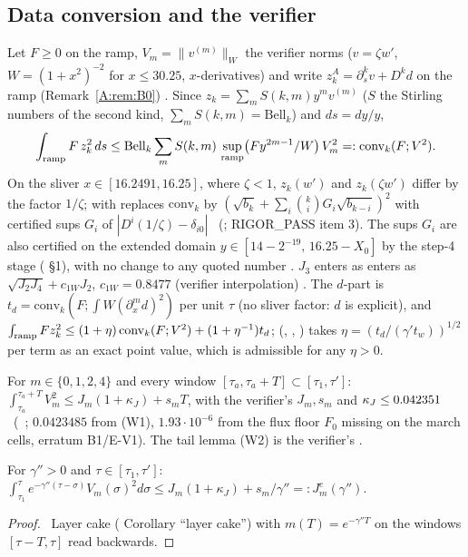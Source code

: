 \documentclass[11pt]{article}
\begin{document}
\subsection{Data conversion and the verifier}
\begin{lemma}\label{A:lem:conv}
Let $F\ge0$ on the ramp, $V_m=\|v^{(m)}\|_W$ the verifier norms ($v=\zeta w'$, $W=(1+x^2)^{-2}$ for $x\le30.25$, $x$-derivatives) and write $z^A_k=\partial_s^kv+D^kd$ on the ramp (Remark~\ref{A:rem:B0}) \tB. Since $z_k=\sum_mS(k,m)y^mv^{(m)}$ ($S$ the Stirling numbers of the second kind, $\sum_mS(k,m)=\mathrm{Bell}_k$) and $ds=dy/y$,
\[
\int_{\rm ramp}F\,z_k^2\,ds\le\mathrm{Bell}_k\sum_mS(k,m)\,\sup_{\rm ramp}\bigl(Fy^{2m-1}/W\bigr)\,V_m^2=:\mathrm{conv}_k(F;V^2).
\]
On the sliver $x\in[16.2491,16.25]$, where $\zeta<1$, $z_k(w')$ and $z_k(\zeta w')$ differ by the factor $1/\zeta$;  with  replaces $\mathrm{conv}_k$ by $(\sqrt{b_k}+\sum_i\binom kiG_i\sqrt{b_{k-i}})^2$ with certified sups $G_i$ of $|D^i(1/\zeta)-\delta_{i0}|$ \tC\ (; RIGOR\_PASS item 3). The sups $G_i$ are also certified on the extended domain $y\in[14-2^{-19},\,16.25-X_0]$ by the step-4 stage  ( \S1), with no change to any quoted number \tC. $J_3$ enters as enters as $\sqrt{J_2J_4}+c_{1W}J_2$, $c_{1W}=0.8477$ (verifier interpolation) \tH. The $d$-part is $t_d=\mathrm{conv}_k(F;\int W(\partial_x^md)^2)$ per unit $\tau$ (no sliver factor: $d$ is explicit), and $\int_{\rm ramp}Fz_k^2\le(1+\eta)\,\mathrm{conv}_k(F;V^2)+(1+\eta^{-1})t_d$;  (, , ) takes $\eta=(t_d/(\gamma't_w))^{1/2}$ per term as an exact point value, which is admissible for any $\eta>0$.
\end{lemma}
\begin{lemma}\label{A:lem:HJ}
For $m\in\{0,1,2,4\}$ and every window $[\tau_a,\tau_a+T]\subset[\tau_1,\tau']$: $\int_{\tau_a}^{\tau_a+T}V_m^2\le J_m(1+\kappa_J)+s_mT$, with the verifier's $J_m,s_m$ and $\kappa_J\le0.042351$ \tC\ (\SA\ ; $0.0423485$ from (W1), $1.93\cdot10^{-6}$ from the flux floor $F_0$ missing on the march cells, erratum B1/E-V1). The tail lemma (W2) is the verifier's \tH.
\end{lemma}
\begin{corollary}\label{A:cor:exp}
For $\gamma''>0$ and $\tau\in[\tau_1,\tau']$: $\int_{\tau_1}^{\tau}e^{-\gamma''(\tau-\sigma)}V_m(\sigma)^2d\sigma\le J_m(1+\kappa_J)+s_m/\gamma''=:J^{e}_m(\gamma'')$.
\end{corollary}
\begin{proof}\tP\ Layer cake ( Corollary ``layer cake'') with $m(T)=e^{-\gamma''T}$ on the windows $[\tau-T,\tau]$ read backwards.
\end{proof}
\end{document}
